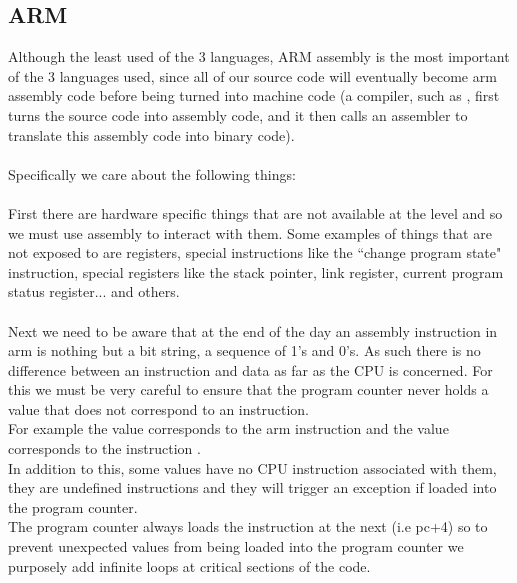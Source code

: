 \documentclass[12pt, svgnames]{book}
\begin{document}
\subsection{ARM}
Although the least used of the 3 languages, ARM assembly is the most important of the 3 languages used, since all of our source code will eventually become arm assembly code before being turned into machine code (a compiler, such as , first turns the source code into assembly code, and it then calls an assembler to translate this assembly code into binary code). 
\\~\\
Specifically we care about the following things:
\\~\\
First there are hardware specific things that are not available at the  level and so we must use assembly to interact with them. Some examples of things that are not exposed to  are registers, special instructions like the ``change program state"  instruction, special registers like the stack pointer, link register, current program status register... and others.
\\~\\ 
Next we need to be aware that at the end of the day an assembly instruction in arm is nothing but a bit string, a sequence of 1's and 0's. As such there is no difference between an instruction and data as far as the CPU is concerned. For this we must be very careful to ensure that the program counter never holds a value that does not correspond to an instruction. 
\\
For example the value corresponds to the arm instruction and the value  corresponds to the instruction . 
\\
In addition to this, some values have no CPU instruction associated with them, they are undefined instructions and they will trigger an exception if loaded into the program counter.
\\
The program counter always loads the instruction at the next  (i.e pc+4) so to prevent unexpected values from being loaded into the program counter we purposely add infinite loops at critical sections of the code. 

\subsection{}
\end{document}
